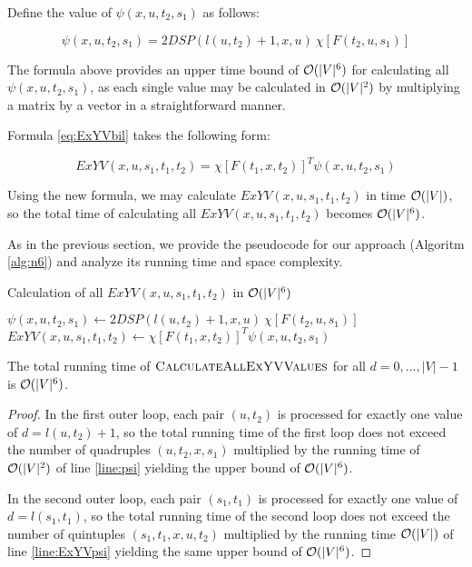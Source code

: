 Define the value of $\psi(x, u, t_2, s_1)$ as follows:

\begin{equation}
\psi(x, u, t_2, s_1) = 2DSP(l(u, t_2) + 1, x, u)~\chi[F(t_2, u, s_1)] \label{eq:psi}
\end{equation}

The formula above provides an upper time bound of $\mathcal{O}(|V|^6)$ for calculating all $\psi(x, u, t_2, s_1)$, as each single value may be calculated in $\mathcal{O}(|V|^2)$ by multiplying a matrix by a vector in a straightforward manner. 

Formula \eqref{eq:ExYVbil} takes the following form:

\begin{equation}
ExYV(x, u, s_1, t_1, t_2) = \chi[F(t_1, x, t_2)]^T \psi(x, u, t_2, s_1) \label{eq:ExYVpsi}
\end{equation}

Using the new formula, we may calculate $ExYV(x, u, s_1, t_1, t_2)$ in time $\mathcal{O}(|V|)$, so the total time of calculating all $ExYV(x, u, s_1, t_1, t_2)$ becomes $\mathcal{O}(|V|^6)$.

As in the previous section, we provide the pseudocode for our approach (Algoritm \ref{alg:n6}) and analyze its running time and space complexity.

\begin{algorithm}
\caption{Calculation of all $ExYV(x, u, s_1, t_1, t_2)$ in $\mathcal{O}(|V|^6)$} \label{alg:n6}
\begin{algorithmic}[1]
            \State $\psi(x, u, t_2, s_1) \gets 2DSP(l(u, t_2) + 1, x, u)~\chi[F(t_2, u, s_1)] \label{line:psi}$
        \EndFor
    \EndFor
                \State $ExYV(x, u, s_1, t_1, t_2) \gets \chi[F(t_1, x, t_2)]^T \psi(x, u, t_2, s_1)$ \label{line:ExYVpsi}
            \EndFor
        \EndFor
    \EndFor
\EndProcedure
\end{algorithmic}
\end{algorithm}

\begin{proposition}
The total running time of $\textsc{CalculateAllExYVValues}$ for all $d = 0, \ldots, |V|-1$ is $\mathcal{O}(|V|^6)$. 
\end{proposition}
\begin{proof}
In the first outer loop, each pair $(u, t_2)$ is processed for exactly one value of $d = l(u, t_2) + 1$, so the total running time of the first loop does not exceed the number of quadruples $(u, t_2, x, s_1)$ multiplied by the running time of $\mathcal{O}(|V|^2)$ of line \ref{line:psi} yielding the upper bound of $\mathcal{O}(|V|^6)$.

In the second outer loop, each pair $(s_1, t_1)$ is processed for exactly one value of $d = l(s_1, t_1)$, so the total running time of the second loop does not exceed the number of quintuples $(s_1, t_1, x, u, t_2)$ multiplied by the running time $\mathcal{O}(|V|)$ of line \ref{line:ExYVpsi} yielding the same upper bound of $\mathcal{O}(|V|^6)$.
\end{proof}

